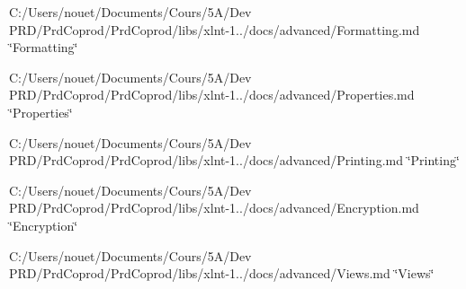 
\begin{DoxyItemize}
\item C\+:/\+Users/nouet/\+Documents/\+Cours/5\+A/\+Dev PRD/\+Prd\+Coprod/\+Prd\+Coprod/libs/xlnt-\/1../docs/advanced/\+Formatting.md \char`\"{}\+Formatting\char`\"{}
\item C\+:/\+Users/nouet/\+Documents/\+Cours/5\+A/\+Dev PRD/\+Prd\+Coprod/\+Prd\+Coprod/libs/xlnt-\/1../docs/advanced/\+Properties.md \char`\"{}\+Properties\char`\"{}
\item C\+:/\+Users/nouet/\+Documents/\+Cours/5\+A/\+Dev PRD/\+Prd\+Coprod/\+Prd\+Coprod/libs/xlnt-\/1../docs/advanced/\+Printing.md \char`\"{}\+Printing\char`\"{}
\item C\+:/\+Users/nouet/\+Documents/\+Cours/5\+A/\+Dev PRD/\+Prd\+Coprod/\+Prd\+Coprod/libs/xlnt-\/1../docs/advanced/\+Encryption.md \char`\"{}\+Encryption\char`\"{}
\item C\+:/\+Users/nouet/\+Documents/\+Cours/5\+A/\+Dev PRD/\+Prd\+Coprod/\+Prd\+Coprod/libs/xlnt-\/1../docs/advanced/\+Views.md \char`\"{}\+Views\char`\"{} 
\end{DoxyItemize}